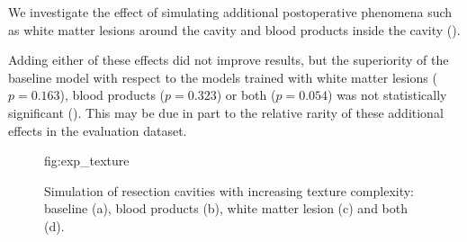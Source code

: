 We investigate the effect of simulating additional postoperative phenomena such as white matter lesions around the cavity and blood products inside the cavity ().

Adding either of these effects did not improve results, but the superiority of the baseline model with respect to the models trained with white matter lesions ($p = 0.163$), blood products ($p = 0.323$) or both ($p = 0.054$) was not statistically significant ().
This may be due in part to the relative rarity of these additional effects in the evaluation dataset.


\begin{figure}
    \centering
    \floatconts
    {fig:exp_texture}
    {\caption{%
        Simulation of resection cavities with increasing texture complexity:
        baseline (a),
        blood products (b),
        white matter lesion (c)
        and both (d).
    }}
    {
    }
\end{figure}